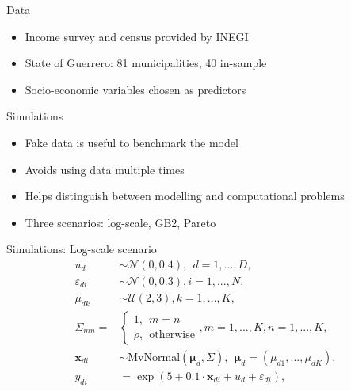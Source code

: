 \begin{frame}{Data}
    \begin{itemize}
        \item Income survey and census provided by INEGI
        \item State of Guerrero: 81 municipalities, 40 in-sample
        \item Socio-economic variables chosen as predictors
    \end{itemize}
\end{frame}

\begin{frame}{Simulations}
    \begin{itemize}
        \item Fake data is useful to benchmark the model
        \item Avoids using data multiple times
        \item Helps distinguish between modelling and computational problems
        \item Three scenarios: log-scale, GB2, Pareto \cite{rojas_perilla_data_2020}
    \end{itemize}
\end{frame}

\begin{frame}{Simulations: Log-scale scenario}
        \vspace{-1cm}
\begin{equation}
    \begin{split}
        u_d & \sim \mathcal N(0, 0.4), ~~ d = 1,...,D,\\
        \varepsilon_{di} & \sim \mathcal{N}(0, 0.3), i = 1,...,N,\\
        \mu_{dk} & \sim \mathcal{U}(2, 3), k = 1,...,K,\\
        \Sigma_{mn} = &\begin{cases} 1, ~~ m = n \\ \rho,  ~~ \text{otherwise}  \end{cases},
        m = 1,...,K, n = 1,...,K,\\
        \boldsymbol x_{di}  &\sim \text{MvNormal} (\boldsymbol \mu_{d}, \Sigma) ,
        ~~ \boldsymbol \mu_{d} = (\mu_{d1}, ..., \mu_{dK}),\\
        y_{di} & = \exp(5 + 0.1 \cdot \boldsymbol x_{di}  + u_d + \varepsilon_{di}),\\
    \end{split}
    \label{eq:log_scenario}
\end{equation}

\end{frame}

